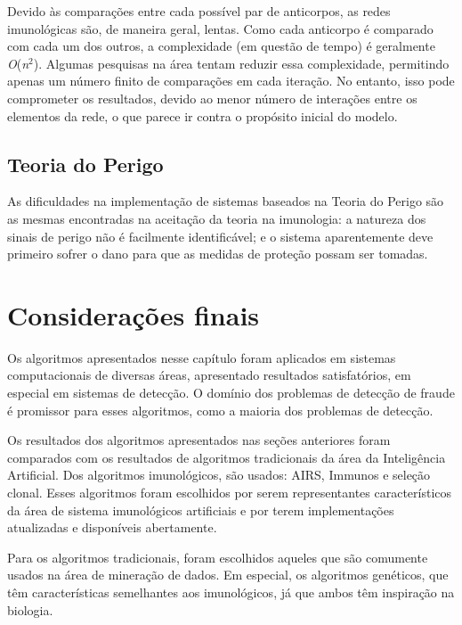 Devido às comparações entre cada possível par de anticorpos, as redes imunológicas são, de maneira geral, lentas. Como cada anticorpo é comparado com cada um dos outros, a complexidade (em questão de tempo) é geralmente \emph{O}(\emph{n$^{2}$}). Algumas pesquisas na área tentam reduzir essa complexidade, permitindo apenas um número finito de comparações em cada iteração. No entanto, isso pode comprometer os resultados, devido ao menor número de interações entre os elementos da rede, o que parece ir contra o propósito inicial do modelo.

\subsection{Teoria do Perigo}

As dificuldades na implementação de sistemas baseados na Teoria do Perigo são as mesmas encontradas na aceitação da teoria na imunologia: a natureza dos sinais de perigo não é facilmente identificável; e o sistema aparentemente deve primeiro sofrer o dano para que as medidas de proteção possam ser tomadas.

\section{Considerações finais}

Os algoritmos apresentados nesse capítulo foram aplicados em sistemas computacionais de diversas áreas, apresentado resultados satisfatórios, em especial em sistemas de detecção. O domínio dos problemas de detecção de fraude é promissor para esses algoritmos, como a maioria dos problemas de detecção.

Os resultados dos algoritmos apresentados nas seções anteriores foram comparados com os resultados de algoritmos tradicionais da área da Inteligência Artificial. Dos algoritmos imunológicos, são usados: AIRS, Immunos e seleção clonal. Esses algoritmos foram escolhidos por serem representantes característicos da área de sistema imunológicos artificiais e por terem implementações atualizadas e disponíveis abertamente.

Para os algoritmos tradicionais, foram escolhidos aqueles que são comumente usados na área de mineração de dados. Em especial, os algoritmos genéticos, que têm características semelhantes aos imunológicos, já que ambos têm inspiração na biologia.


